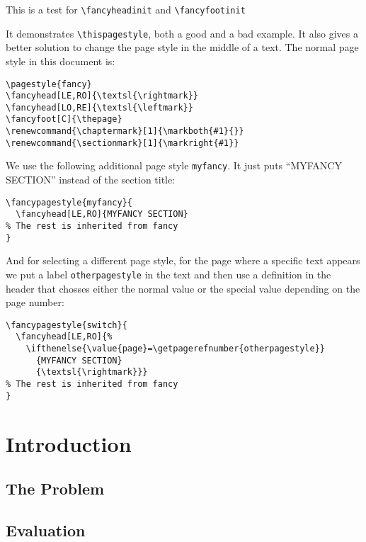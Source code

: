 \documentclass[openany]{book}
\renewcommand{\chaptermark}[1]{\markboth{#1}{}}
\renewcommand{\sectionmark}[1]{\markright{#1}}
\begin{document}
\tableofcontents
\newpage
\thispagestyle{plain}
\noindent
\begin{boxedminipage}{\textwidth}
This is a test for \verb|\fancyheadinit| and \verb|\fancyfootinit|

It demonstrates \verb|\thispagestyle|, both a good and a bad example.
It also gives a better solution to change the page style in the middle of a text.
The normal page style in this document is:
\begin{verbatim}
\pagestyle{fancy}
\fancyhead[LE,RO]{\textsl{\rightmark}}
\fancyhead[LO,RE]{\textsl{\leftmark}}
\fancyfoot[C]{\thepage}
\renewcommand{\chaptermark}[1]{\markboth{#1}{}}
\renewcommand{\sectionmark}[1]{\markright{#1}}
\end{verbatim}
We use the following additional page style \texttt{myfancy}. It just puts ``MYFANCY SECTION'' instead of the section title:
\begin{verbatim}
\fancypagestyle{myfancy}{
  \fancyhead[LE,RO]{MYFANCY SECTION}
% The rest is inherited from fancy
}
\end{verbatim}
And for selecting a different page style, for the page where a specific text appears we put a label \texttt{otherpagestyle} in the text and then use a definition in the header that chosses either the normal value or the special value depending on the page number:
\begin{verbatim}
\fancypagestyle{switch}{
  \fancyhead[LE,RO]{%
    \ifthenelse{\value{page}=\getpagerefnumber{otherpagestyle}}
      {MYFANCY SECTION}
      {\textsl{\rightmark}}}
% The rest is inherited from fancy
}
\end{verbatim}

\end{boxedminipage}

\chapter{Introduction}

\lipsum[1]

\section{The Problem}
\label{sec:problem}

\lipsum[2-3]

\section{Evaluation}
\end{document}
